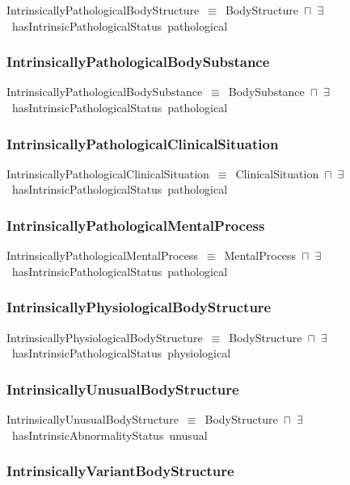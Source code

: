\documentclass{article}
\begin{document}
IntrinsicallyPathologicalBodyStructure~\ensuremath{\equiv}~BodyStructure~\ensuremath{\sqcap}~\ensuremath{\exists}~hasIntrinsicPathologicalStatus~pathological

\subsubsection*{IntrinsicallyPathologicalBodySubstance}

IntrinsicallyPathologicalBodySubstance~\ensuremath{\equiv}~BodySubstance~\ensuremath{\sqcap}~\ensuremath{\exists}~hasIntrinsicPathologicalStatus~pathological

\subsubsection*{IntrinsicallyPathologicalClinicalSituation}

IntrinsicallyPathologicalClinicalSituation~\ensuremath{\equiv}~ClinicalSituation~\ensuremath{\sqcap}~\ensuremath{\exists}~hasIntrinsicPathologicalStatus~pathological

\subsubsection*{IntrinsicallyPathologicalMentalProcess}

IntrinsicallyPathologicalMentalProcess~\ensuremath{\equiv}~MentalProcess~\ensuremath{\sqcap}~\ensuremath{\exists}~hasIntrinsicPathologicalStatus~pathological

\subsubsection*{IntrinsicallyPhysiologicalBodyStructure}

IntrinsicallyPhysiologicalBodyStructure~\ensuremath{\equiv}~BodyStructure~\ensuremath{\sqcap}~\ensuremath{\exists}~hasIntrinsicPathologicalStatus~physiological

\subsubsection*{IntrinsicallyUnusualBodyStructure}

IntrinsicallyUnusualBodyStructure~\ensuremath{\equiv}~BodyStructure~\ensuremath{\sqcap}~\ensuremath{\exists}~hasIntrinsicAbnormalityStatus~unusual

\subsubsection*{IntrinsicallyVariantBodyStructure}
\end{document}
